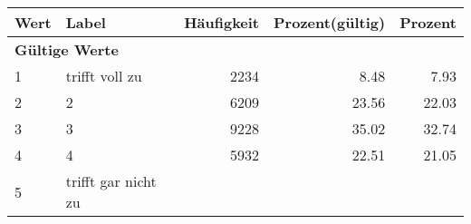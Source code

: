      \begin{longtable}{lXrrr}
     \toprule
     \textbf{Wert} & \textbf{Label} & \textbf{Häufigkeit} & \textbf{Prozent(gültig)} & \textbf{Prozent} \\
     \endhead
     \midrule
     \multicolumn{5}{l}{\textbf{Gültige Werte}}\\

     1 &
     \multicolumn{1}{X}{ trifft voll zu   } &


       \num{2234} &
       \num[round-mode=places,round-precision=2]{8,48} &
         \num[round-mode=places,round-precision=2]{7,93} \\

     2 &
     \multicolumn{1}{X}{ 2   } &


       \num{6209} &
       \num[round-mode=places,round-precision=2]{23,56} &
         \num[round-mode=places,round-precision=2]{22,03} \\

     3 &
     \multicolumn{1}{X}{ 3   } &


       \num{9228} &
       \num[round-mode=places,round-precision=2]{35,02} &
         \num[round-mode=places,round-precision=2]{32,74} \\

     4 &
     \multicolumn{1}{X}{ 4   } &


       \num{5932} &
       \num[round-mode=places,round-precision=2]{22,51} &
         \num[round-mode=places,round-precision=2]{21,05} \\

     5 &
     \multicolumn{1}{X}{ trifft gar nicht zu   } &



\end{longtable}
